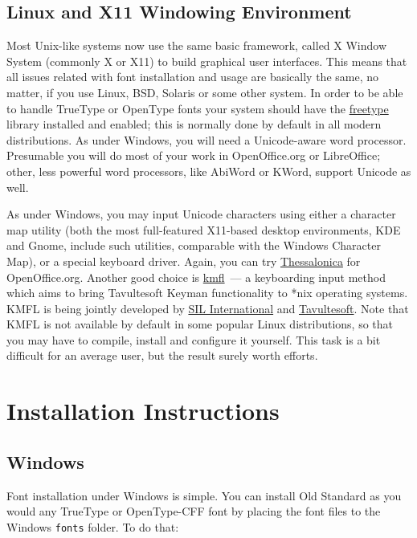 \documentclass[12pt,a4paper,openany]{book}
\begin{document}
\subsection{Linux and X11 Windowing Environment}

Most Unix-like systems now use the same basic framework, called X Window
System (commonly X or X11) to build graphical user interfaces. This means
that all issues related with font installation and usage are basically the
same, no matter, if you use Linux, BSD, Solaris or some other system. In
order to be able to handle TrueType or OpenType fonts your system should
have the \href{http://freetype.sourceforge.net}{freetype} library installed
and enabled; this is normally done by default in all modern distributions.
As under Windows, you will need a Unicode-aware word processor. Presumable
you will do most of your work in OpenOffice.org or LibreOffice; other, less powerful word
processors, like AbiWord or KWord, support Unicode as well.

As under Windows, you may input Unicode characters using either a character
map utility (both the most full-featured X11-based desktop environments,
KDE and Gnome, include such utilities, comparable with the Windows
Character Map), or a special keyboard driver. Again, you can try
\href{http://www.thessalonica.org.ru}{Thessalonica} for OpenOffice.org.
Another good choice is \href{href://kmfl.sourceforge.net}{kmfl}~— a
keyboarding input method which aims to bring Tavultesoft Keyman
functionality to *nix operating systems. KMFL is being jointly developed by
\href{http://www.sil.org}{SIL International} and
\href{http://www.tavultesoft.com}{Tavultesoft}. Note that KMFL is not
available by default in some popular Linux distributions, so that
you may have to compile, install and configure it yourself. This task
is a bit difficult for an average user, but the result surely worth
efforts.

\section{Installation Instructions}

\subsection{Windows}

Font installation under Windows is simple. You can install Old Standard as
you would any TrueType or OpenType-CFF font by placing the font files to
the Windows \texttt{fonts} folder. To do that:
\end{document}
